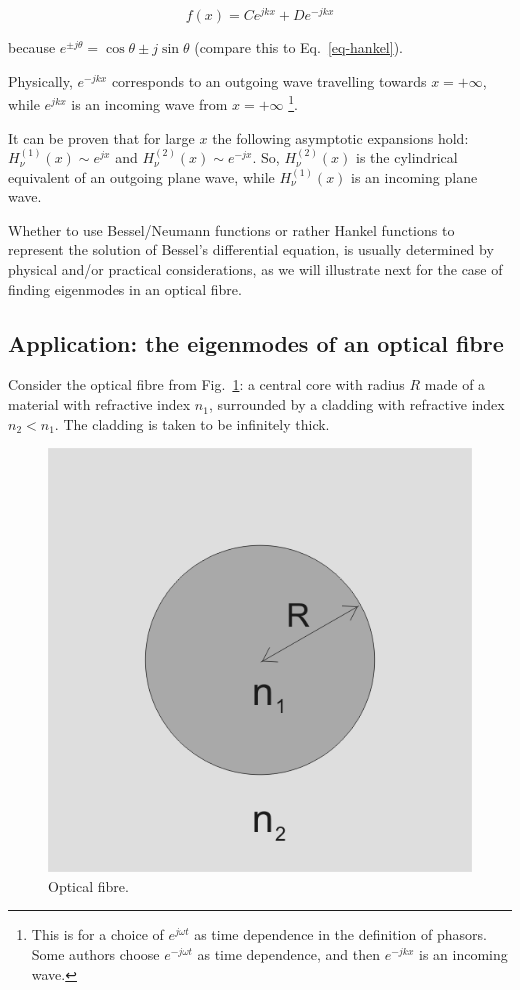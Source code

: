 \begin{equation}
f(x) = C e^{jkx} + D e^{-jkx}
\end{equation} 

because $e^{\pm j \theta} = \cos \theta \pm j \sin \theta$ (compare this to Eq.~\ref{eq-hankel}).

Physically, $e^{-jkx}$ corresponds to an outgoing wave travelling towards $x=+\infty$, while $e^{jkx}$ is an incoming wave from $x=+\infty$ \footnote{This is for a choice of $e^{j \omega t}$ as time dependence in the definition of phasors. Some authors choose $e^{-j \omega t}$ as time dependence, and then $e^{-jkx}$ is an incoming wave.}.

It can be proven that for large $x$ the following asymptotic expansions hold:
$H_{\nu}^{(1)}(x) \sim e^{jx}$ and  $H_{\nu}^{(2)}(x) \sim e^{-jx}$. So, $H_{\nu}^{(2)}(x)$ is the cylindrical equivalent of an outgoing plane wave, while $H_{\nu}^{(1)}(x)$ is an incoming plane wave.

Whether to use Bessel/Neumann functions or rather Hankel functions to represent the solution of Bessel's differential equation, is usually determined by physical and/or practical considerations, as we will illustrate next for the case of finding eigenmodes in an optical fibre.

\subsection{Application: the eigenmodes of an optical fibre}

Consider the optical fibre from Fig.~\ref{fig-fibre}: a central core with radius $R$ made of a material with refractive index $n_1$, surrounded by a cladding with refractive index $n_2 < n_1$. The cladding is taken to be infinitely thick. 

\begin{figure}
\centering
\includegraphics{special/figures/fibre}
\caption{Optical fibre.}
\label{fig-fibre}
\end{figure}

